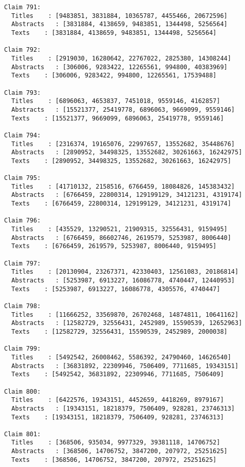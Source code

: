\documentclass[11pt]{article}
\begin{document}
\begin{Verbatim}[commandchars=\\\{\}]
Claim 791:
  Titles    : [9483851, 3831884, 10365787, 4455466, 20672596]
  Abstracts   : [3831884, 4138659, 9483851, 1344498, 5256564]
  Texts    : [3831884, 4138659, 9483851, 1344498, 5256564]

Claim 792:
  Titles    : [2919030, 16280642, 22767022, 2825380, 14308244]
  Abstracts   : [306006, 9283422, 12265561, 994800, 40383969]
  Texts    : [306006, 9283422, 994800, 12265561, 17539488]

Claim 793:
  Titles    : [6896063, 4653837, 7451018, 9559146, 4162857]
  Abstracts   : [15521377, 25419778, 6896063, 9669099, 9559146]
  Texts    : [15521377, 9669099, 6896063, 25419778, 9559146]

Claim 794:
  Titles    : [2316374, 19165076, 22997657, 13552682, 35448676]
  Abstracts   : [2890952, 34498325, 13552682, 30261663, 16242975]
  Texts    : [2890952, 34498325, 13552682, 30261663, 16242975]

Claim 795:
  Titles    : [41710132, 2158516, 6766459, 18084826, 145383432]
  Abstracts   : [6766459, 22800314, 129199129, 34121231, 4319174]
  Texts    : [6766459, 22800314, 129199129, 34121231, 4319174]

Claim 796:
  Titles    : [435529, 13290521, 21909315, 32556431, 9159495]
  Abstracts   : [6766459, 86602746, 2619579, 5253987, 8006440]
  Texts    : [6766459, 2619579, 5253987, 8006440, 9159495]

Claim 797:
  Titles    : [20130904, 23267371, 42330403, 12561083, 20186814]
  Abstracts   : [5253987, 6913227, 16086778, 4740447, 12440953]
  Texts    : [5253987, 6913227, 16086778, 4305576, 4740447]

Claim 798:
  Titles    : [11666252, 33569870, 26702468, 14874811, 10641162]
  Abstracts   : [12582729, 32556431, 2452989, 15590539, 12652963]
  Texts    : [12582729, 32556431, 15590539, 2452989, 2000038]

Claim 799:
  Titles    : [5492542, 26008462, 5586392, 24790460, 14626540]
  Abstracts   : [36831892, 22309946, 7506409, 7711685, 19343151]
  Texts    : [5492542, 36831892, 22309946, 7711685, 7506409]

Claim 800:
  Titles    : [6422576, 19343151, 4452659, 4418269, 8979167]
  Abstracts   : [19343151, 18218379, 7506409, 928281, 23746313]
  Texts    : [19343151, 18218379, 7506409, 928281, 23746313]

Claim 801:
  Titles    : [368506, 935034, 9977329, 39381118, 14706752]
  Abstracts   : [368506, 14706752, 3847200, 207972, 25251625]
  Texts    : [368506, 14706752, 3847200, 207972, 25251625]


\end{Verbatim}
\end{document}

